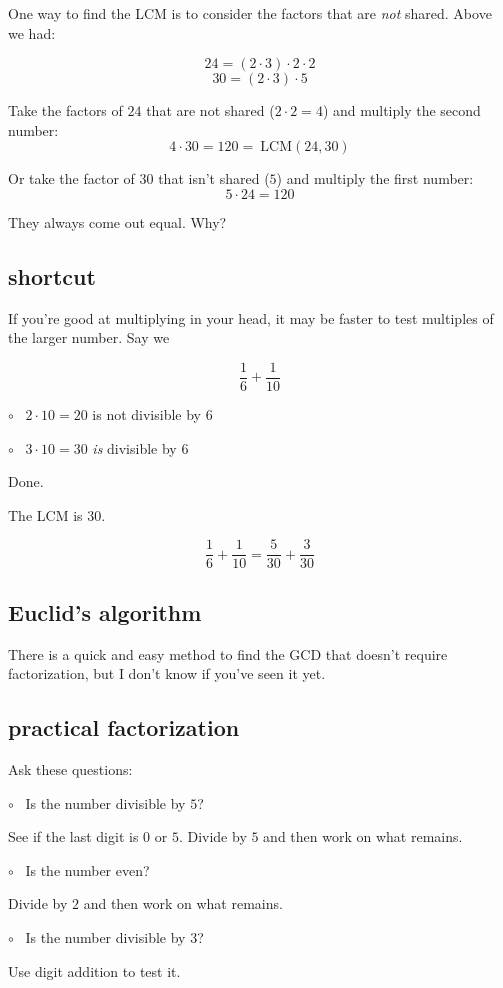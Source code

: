 \documentclass[11pt, oneside]{article}
\begin{document}
One way to find the LCM is to consider the factors that are \emph{not} shared.  Above we had:

\[ 24 = (2 \cdot 3) \cdot 2 \cdot 2 \]
\[ 30 = (2 \cdot 3) \cdot 5  \]

Take the factors of $24$ that are not shared ($2 \cdot 2 = 4$) and multiply the second number:  
\[ 4 \cdot 30 = 120 = \ \text{LCM}(24,30) \]

Or take the factor of $30$ that isn't shared ($5$) and multiply the first number:  
\[ 5 \cdot 24 = 120 \]

They always come out equal.  Why?

\subsection*{shortcut}
If you're good at multiplying in your head, it may be faster to test multiples of the larger number.  Say we 

\[ \frac{1}{6} + \frac{1}{10} \]

$\circ$ \ $2 \cdot 10 = 20$ is not divisible by $6$

$\circ$ \ $3 \cdot 10 = 30$ \emph{is} divisible by $6$

Done.  

The LCM is $30$.

\[ \frac{1}{6} + \frac{1}{10} = \frac{5}{30} + \frac{3}{30}  \]

\subsection*{Euclid's algorithm}
There is a quick and easy method to find the GCD that doesn't require factorization, but I don't know if you've seen it yet.

\subsection*{practical factorization}
Ask these questions:

$\circ$ \ Is the number divisible by $5$?  

See if the last digit is $0$ or $5$.  Divide by $5$ and then work on what remains.

$\circ$ \ Is the number even?  

Divide by $2$ and then work on what remains.

$\circ$ \ Is the number divisible by $3$?

Use digit addition to test it.  
\end{document}
